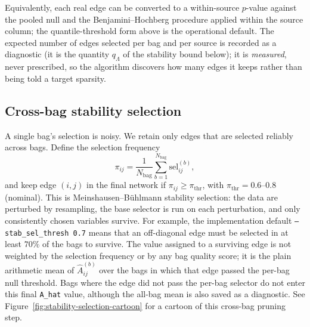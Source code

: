 \documentclass[11pt]{article}
\begin{document}
Equivalently, each real edge can be converted to a within-source \(p\)-value
against the pooled null and the Benjamini--Hochberg procedure applied within
the source column; the quantile-threshold form above is the operational default. The
expected number of edges selected per bag and per source is recorded as a
diagnostic (it is the quantity \(q_\Lambda\) of the stability bound below);
it is \emph{measured}, never prescribed, so the algorithm discovers how many
edges it keeps rather than being told a target sparsity.

\subsection{Cross-bag stability selection}

A single bag's selection is noisy. We retain only edges that are selected
reliably across bags. Define the selection frequency
\[
\pi_{ij} = \frac{1}{N_{\text{bag}}}\sum_{b=1}^{N_{\text{bag}}}\text{sel}^{(b)}_{ij},
\]
and keep edge \((i,j)\) in the final network if
\(\pi_{ij}\ge\pi_{\text{thr}}\), with
\(\pi_{\text{thr}}=0.6\)--\(0.8\) (nominal). This is Meinshausen--B\"uhlmann
stability selection: the data are perturbed by resampling, the base selector
is run on each perturbation, and only consistently chosen variables survive.
For example, the implementation default \texttt{--stab\_sel\_thresh 0.7} means that
an off-diagonal edge must be selected in at least \(70\%\) of the bags to
survive. The value assigned to a surviving edge is not weighted by the
selection frequency or by any bag quality score; it is the plain arithmetic
mean of \(\hat A^{(b)}_{ij}\) over the bags in which that edge passed the
per-bag null threshold. Bags where the edge did not pass the per-bag selector
do not enter this final \texttt{A\_hat} value, although the all-bag mean is
also saved as a diagnostic.
See Figure~\ref{fig:stability-selection-cartoon} for a cartoon of this
cross-bag pruning step.
\end{document}
